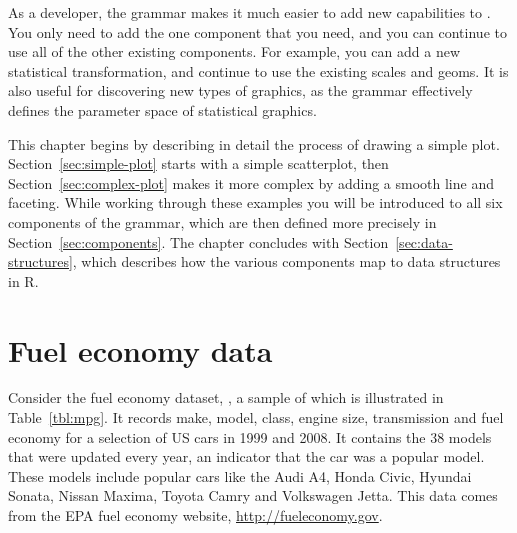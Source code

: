 As a developer, the grammar makes it much easier to add new capabilities to \ggplot. You only need to add the one component that you need, and you can continue to use all of the other existing components.  For example, you can add a new statistical transformation, and continue to use the existing scales and geoms.  It is also useful for discovering new types of graphics, as the grammar effectively defines the parameter space of statistical graphics.

This chapter begins by describing in detail the process of drawing a simple plot.  Section~\ref{sec:simple-plot} starts with a simple scatterplot, then Section~\ref{sec:complex-plot} makes it more complex by adding a smooth line and faceting.  While working through these examples you will be introduced to all six components of the grammar, which are then defined more precisely in Section~\ref{sec:components}.  The chapter concludes with Section~\ref{sec:data-structures}, which describes how the various components map to data structures in R.  

\section{Fuel economy data}
\label{sec:fuel_economy_data}

Consider the fuel economy dataset, , a sample of which is illustrated in Table~\ref{tbl:mpg}. It records make, model, class, engine size, transmission and fuel economy for a selection of US cars in 1999 and 2008. It contains the 38 models that were updated every year, an indicator that the car was a popular model. These models include popular cars like the Audi A4, Honda Civic, Hyundai Sonata, Nissan Maxima, Toyota Camry and Volkswagen Jetta. This data comes from the EPA fuel economy website, \url{http://fueleconomy.gov}. 

